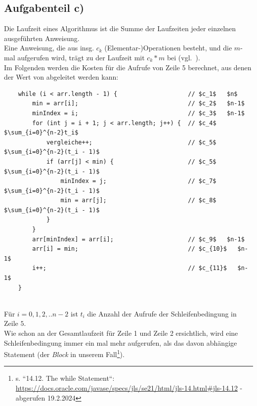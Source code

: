 \subsection{Aufgabenteil c)}

Die Laufzeit eines Algorithmus ist die Summe der Laufzeiten jeder einzelnen ausgeführten Anweisung.\\
Eine Anweisung, die aus insg. $c_k$ (Elementar-)Operationen besteht, und die $m$-mal aufgerufen wird, trägt zu der Laufzeit mit $c_k * m$ bei (vgl.~\cite[29 f.]{CL22}).\\

\noindent
Im Folgenden werden die Kosten für die Aufrufe von Zeile 5 berechnet, aus denen der Wert von  abgeleitet werden kann:

\begin{verbatim}
    while (i < arr.length - 1) {                    // $c_1$   $n$
        min = arr[i];                               // $c_2$   $n-1$
        minIndex = i;                               // $c_3$   $n-1$
        for (int j = i + 1; j < arr.length; j++) {  // $c_4$   $\sum_{i=0}^{n-2}t_i$
            vergleiche++;                           // $c_5$   $\sum_{i=0}^{n-2}(t_i - 1)$
            if (arr[j] < min) {                     // $c_5$   $\sum_{i=0}^{n-2}(t_i - 1)$
                minIndex = j;                       // $c_7$   $\sum_{i=0}^{n-2}(t_i - 1)$
                min = arr[j];                       // $c_8$   $\sum_{i=0}^{n-2}(t_i - 1)$
            }
        }
        arr[minIndex] = arr[i];                     // $c_9$   $n-1$
        arr[i] = min;                               // $c_{10}$   $n-1$
        i++;                                        // $c_{11}$   $n-1$
    }
\end{verbatim}\\

\noindent
Für $i = 0, 1, 2, .. n - 2$ ist $t_i$ die Anzahl der Aufrufe der Schleifenbedingung in Zeile $5$.\\
Wie schon an der Gesamtlaufzeit für Zeile 1 und Zeile 2 ersichtlich, wird eine Schleifenbedingung immer ein mal mehr aufgerufen, als das davon abhängige Statement (der \textit{Block} in unserem Fall\footnote{s. ``14.12. The while Statement``: \url{https://docs.oracle.com/javase/specs/jls/se21/html/jls-14.html#jls-14.12} - abgerufen 19.2.2024
}).\\

